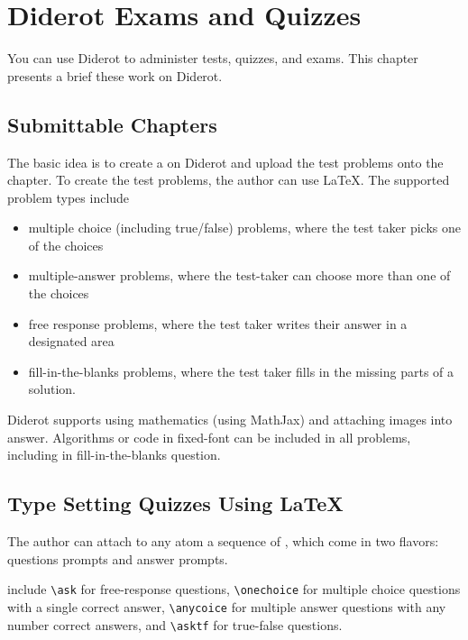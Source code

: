 \chapter{Diderot Exams and Quizzes}
\label{ch:quiz}
 
\begin{preamble}
You can use Diderot to administer tests, quizzes, and exams.  This chapter presents a brief these work on Diderot.
\end{preamble}


\section{Submittable Chapters}

The basic idea is to create a  on Diderot and upload the test problems onto the chapter.  To create the test problems, the author can use LaTeX.  The supported problem types include
\begin{itemize}
\item multiple choice (including true/false) problems, where the test taker picks one of the
  choices
\item multiple-answer problems, where the test-taker can choose more than one of the choices
\item free response problems, where the test taker writes their answer in a designated area
\item fill-in-the-blanks problems, where the test taker fills in the missing parts of a solution.
\end{itemize}


Diderot supports using mathematics (using MathJax) and attaching images into answer.  Algorithms or code in fixed-font can be included in all problems, including in fill-in-the-blanks question.

\section{Type Setting Quizzes Using LaTeX}


The author can attach to any atom a sequence of , which come in two flavors: questions prompts and answer prompts.
%

  include 
%
\lstinline`\ask` for free-response questions, 
%
\lstinline`\onechoice` for multiple choice questions with a single correct answer, 
%
\lstinline`\anycoice` for multiple answer questions with any number correct answers, and 
%
\lstinline`\asktf` for true-false questions.

